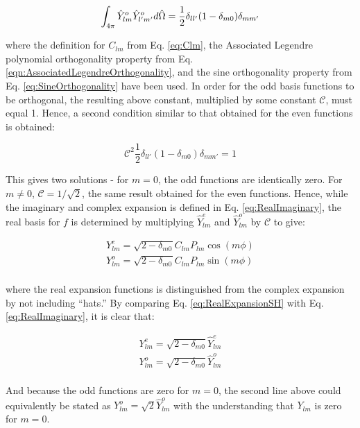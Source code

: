 \begin{tcolorbox}[breakable]
\begin{equation}
\label{eq:OddRequriedOrthogonality2}
\int_{4\pi}^{}\hat{Y}_{lm}^o\hat{Y}_{l'm'}^od\hat{\Omega}  =\frac{1}{2}\delta_{ll'}(1-\delta_{m0})\delta_{mm'}
\end{equation}

where the definition for \(C_{lm}\) from Eq. \eqref{eq:Clm}, the Associated Legendre polynomial orthogonality property from Eq. \eqref{eqn:AssociatedLegendreOrthogonality}, and the sine orthogonality property from Eq. \eqref{eq:SineOrthogonality} have been used. In order for the odd basis functions to be orthogonal, the resulting above constant, multiplied by some constant \(\mathscr{C}\), must equal 1. Hence, a second condition similar to that obtained for the even functions is obtained:

\begin{equation}
\mathscr{C}^2\frac{1}{2}\delta_{ll'}(1-\delta_{m0})\delta_{mm'}=1
\end{equation} 

This gives two solutions - for \(m=0\), the odd functions are identically zero. For \(m\neq0\), \(\mathscr{C}=1/\sqrt{2}\), the same result obtained for the even functions. Hence, while the imaginary and complex expansion is defined in Eq. \eqref{eq:RealImaginary}, the real basis for \(f\) is determined by multiplying \(\hat{Y}_{lm}^e\) and \(\hat{Y}_{lm}^o\) by \(\mathscr{C}\) to give:

\begin{equation}
\label{eq:RealExpansionSH}
\begin{aligned}
Y_{lm}^e=\sqrt{2-\delta_{m0}}C_{lm}P_{lm}\cos{(m\phi)}\\
Y_{lm}^o=\sqrt{2-\delta_{m0}}C_{lm}P_{lm}\sin{(m\phi)}\\
\end{aligned}
\end{equation}

where the real expansion functions is distinguished from the complex expansion by not including ``hats.'' By comparing Eq. \eqref{eq:RealExpansionSH} with Eq. \eqref{eq:RealImaginary}, it is clear that:

\begin{equation}
\label{eq:HattoNoHat}
\begin{aligned}
Y_{lm}^e=\sqrt{2-\delta_{m0}}\hat{Y}_{lm}^e\\
Y_{lm}^o=\sqrt{2-\delta_{m0}}\hat{Y}_{lm}^o\\
\end{aligned}
\end{equation}

And because the odd functions are zero for \(m=0\), the second line above could equivalently be stated as \(Y_{lm}^o=\sqrt{2}\hat{Y}_{lm}^o\) with the understanding that \(Y_{lm}\) is zero for \(m=0\). 

\end{tcolorbox}


